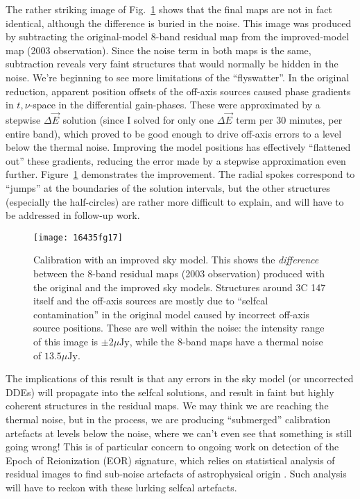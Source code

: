 \documentclass{aa}
\newcommand{\jones}[2]{\vec {#1}_{#2}}
\begin{document}
The rather striking image of Fig.~\ref{fig:diff-newmodel} shows that the final maps are not in fact identical, although the difference is buried in the noise. This image was produced by subtracting the original-model 8-band residual map from the improved-model map (2003 observation). 
Since the noise term in both maps is the same, subtraction reveals very faint structures that would normally be hidden in the noise. We're beginning to see more limitations of the ``flyswatter''. In the original reduction, apparent position offsets of the off-axis sources caused phase gradients in $t,\nu$-space in the differential gain-phases. These were approximated by a stepwise $\Delta\jones{E}{}$ solution (since I solved for only one $\Delta\jones{E}{}$ term per 30 minutes, per entire band), which proved to be good enough to drive off-axis errors to a level below the thermal noise. Improving the model positions has effectively ``flattened out'' these gradients, reducing the error made by a stepwise approximation even further. Figure~\ref{fig:diff-newmodel} demonstrates the improvement. The radial spokes correspond to ``jumps'' at the boundaries of the solution intervals, but the other structures (especially the half-circles) are rather more difficult to explain, and will have to be addressed in follow-up work.

\begin{figure}
\begin{centering}
\texttt{[image: 16435fg17]}%
\end{centering}
\caption{\label{fig:diff-newmodel}Calibration with an improved sky model. This shows the \emph{difference} between the 8-band residual maps (2003 observation) produced with the original and the improved sky models. Structures around 3C 147 itself and the off-axis sources are mostly due to ``selfcal contamination'' in the original model caused by incorrect off-axis source positions. These are well within the noise: the intensity range of this image is $\pm2 \mu\mathrm{Jy}$, while the 8-band maps have a thermal noise of $13.5 \mu\mathrm{Jy}$.}
\end{figure}

The implications of this result is that any errors in the sky model (or uncorrected DDEs) will propagate into the selfcal solutions, and result in faint but highly coherent structures in the residual maps. We may think we are reaching the thermal noise, but in the process, we are producing ``submerged'' calibration artefacts at levels below the noise, where we can't even see that something is still going wrong! This is of particular concern to ongoing work on detection of the Epoch of Reionization (EOR) signature, which relies on statistical analysis of residual images to find sub-noise artefacts of astrophysical origin \citep{EOR-LOFAR,EOR-MWA}. Such analysis will have to reckon with these lurking selfcal artefacts.
\end{document}
